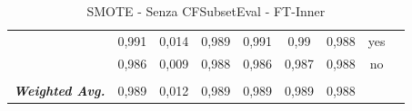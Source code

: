 \begin{table}[htbp]
{\begin{tabular}{rrrrrrrrr}
			\multicolumn{1}{c}{} & \multicolumn{1}{c}{0,991} & \multicolumn{1}{c}{0,014} & \multicolumn{1}{c}{0,989} & \multicolumn{1}{c}{0,991} & \multicolumn{1}{c}{0,99} & \multicolumn{1}{c}{0,988} & \multicolumn{1}{c}{yes} &  \\
			\multicolumn{1}{c}{} & \multicolumn{1}{c}{0,986} & \multicolumn{1}{c}{0,009} & \multicolumn{1}{c}{0,988} & \multicolumn{1}{c}{0,986} & \multicolumn{1}{c}{0,987} & \multicolumn{1}{c}{0,988} & \multicolumn{1}{c}{no} &  \\
			\multicolumn{1}{c}{} & \multicolumn{1}{c}{} & \multicolumn{1}{c}{} & \multicolumn{1}{c}{} & \multicolumn{1}{c}{} & \multicolumn{1}{c}{} & \multicolumn{1}{c}{} & \multicolumn{1}{c}{} &  \\
			\multicolumn{1}{c}{\textit{\textbf{Weighted Avg.}}} & \multicolumn{1}{c}{0,989} & \multicolumn{1}{c}{0,012} & \multicolumn{1}{c}{0,989} & \multicolumn{1}{c}{0,989} & \multicolumn{1}{c}{0,989} & \multicolumn{1}{c}{0,988} & \multicolumn{1}{c}{} &  \\
		\end{tabular}%
	}
	\label{tab:FTInnerExtend}%
	\caption{ SMOTE - Senza CFSubsetEval - FT-Inner}
\end{table}%

